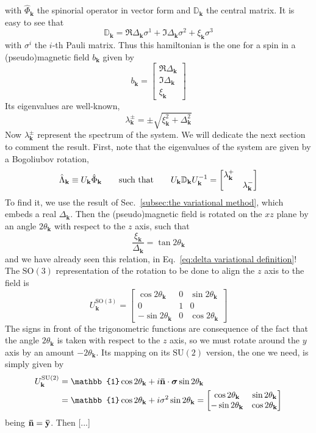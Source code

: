 with $\hat{\Phi}_\mathbf{k}$ the spinorial operator in vector form and $\mathbb{D}_\mathbf{k}$ the central matrix. It is easy to see that
\[
	\mathbb{D}_\mathbf{k} = \Re{\Delta_\mathbf{k}} \sigma^1 + \Im{\Delta_\mathbf{k}} \sigma^2 + \xi_\mathbf{k} \sigma^3
\]
with $\sigma^i$ the $i$-th Pauli matrix. Thus this hamiltonian is the one for a spin in a (pseudo)magnetic field $b_\mathbf{k}$ given by
\[
	b_\mathbf{k} = \begin{bmatrix}
		\Re{\Delta_\mathbf{k}} \\ \Im{\Delta_\mathbf{k}} \\ \xi_\mathbf{k}
	\end{bmatrix}
\]
Its eigenvalues are well-known,
\[
	\lambda_\mathbf{k}^\pm = \pm \sqrt{\xi_\mathbf{k}^2 + \Delta_\mathbf{k}^2}
\]
Now $\lambda_\mathbf{k}^\pm$ represent the spectrum of the system. We will dedicate the next section to comment the result. First, note that the eigenvalues of the system are given by a Bogoliubov rotation,
\[
	\hat{\Lambda}_\mathbf{k} \equiv U_\mathbf{k} \hat{\Phi}_\mathbf{k}
	\quad\qq{such that}\quad
	U_\mathbf{k} \mathbb{D}_\mathbf{k} U_\mathbf{k}^{-1} = \begin{bmatrix}
		\lambda_\mathbf{k}^+ & \\
		& \lambda_\mathbf{k}^-
	\end{bmatrix}
\]
To find it, we use the result of Sec.~\ref{subsec:the variational method}, which embeds a real $\Delta_\mathbf{k}$. Then the (pseudo)magnetic field is rotated on the $xz$ plane by an angle $2\theta_\mathbf{k}$ with respect to the $z$ axis, such that
\[
	\frac{\xi_\mathbf{k}}{\Delta_\mathbf{k}} =  \tan 2\theta_\mathbf{k}
\]
and we have already seen this relation, in Eq.~\eqref{eq:delta variational definition}! The $\mathrm{SO}(3)$ representation of the rotation to be done to align the $z$ axis to the field is
\[
	U_\mathbf{k}^{\mathrm{SO}(3)} = \begin{bmatrix}
		\cos 2\theta_\mathbf{k} & 0 & \sin 2\theta_\mathbf{k} \\
		0 & 1 & 0 \\
		- \sin 2\theta_\mathbf{k} & 0 & \cos 2\theta_\mathbf{k}
	\end{bmatrix}
\]
The signs in front of the trigonometric functions are consequence of the fact that the angle $2\theta_\mathbf{k}$ is taken with respect to the $z$ axis, so we must rotate around the $y$ axis by an amount $-2\theta_\mathbf{k}$.
Its mapping on its $\mathrm{SU}(2)$ version, the one we need, is simply given by
\[
\begin{aligned}
	U_\mathbf{k}^{\mathrm{SU}(2)} &= \mathbb{1} \cos 2\theta_\mathbf{k} + i \versor{n} \cdot \bm{\sigma} \sin 2\theta_\mathbf{k}\\
	&= \mathbb{1} \cos 2\theta_\mathbf{k} + i \sigma^2 \sin 2\theta_\mathbf{k} = \begin{bmatrix}
		\cos 2\theta_\mathbf{k} & \sin 2\theta_\mathbf{k} \\
		-\sin 2\theta_\mathbf{k} & \cos 2\theta_\mathbf{k}
	\end{bmatrix}
\end{aligned}
\]
being $\mathbf{\bar{n}} = \mathbf{\bar{y}}$. Then [...]

